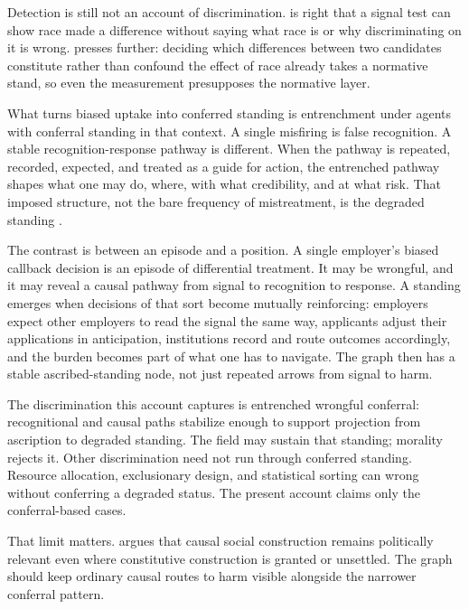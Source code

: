 \documentclass[12pt]{article}
\begin{document}
Detection is still not an account of discrimination. \textcite{kohlerHausmann2019EddieMurphy} is right that a signal test can show race made a difference without saying what race is or why discriminating on it is wrong. \textcite{huForthcomingNormativeFactsCausalStructure} presses further: deciding which differences between two candidates constitute rather than confound the effect of race already takes a normative stand, so even the measurement presupposes the normative layer.

What turns biased uptake into conferred standing is entrenchment under agents with conferral standing in that context. A single misfiring is false recognition. A stable recognition-response pathway is different. When the pathway is repeated, recorded, expected, and treated as a guide for action, the entrenched pathway shapes what one may do, where, with what credibility, and at what risk. That imposed structure, not the bare frequency of mistreatment, is the degraded standing \citep{asta2018Categories}.

The contrast is between an episode and a position. A single employer's biased callback decision is an episode of differential treatment. It may be wrongful, and it may reveal a causal pathway from signal to recognition to response. A standing emerges when decisions of that sort become mutually reinforcing: employers expect other employers to read the signal the same way, applicants adjust their applications in anticipation, institutions record and route outcomes accordingly, and the burden becomes part of what one has to navigate. The graph then has a stable ascribed-standing node, not just repeated arrows from signal to harm.

The discrimination this account captures is entrenched wrongful conferral: recognitional and causal paths stabilize enough to support projection from ascription to degraded standing. The field may sustain that standing; morality rejects it. Other discrimination need not run through conferred standing. Resource allocation, exclusionary design, and statistical sorting can wrong without conferring a degraded status. The present account claims only the conferral-based cases.

That limit matters. \textcite[pp.~19--23]{marques2017CausalSocialConstruction} argues that causal social construction remains politically relevant even where constitutive construction is granted or unsettled. The graph should keep ordinary causal routes to harm visible alongside the narrower conferral pattern.
\end{document}
